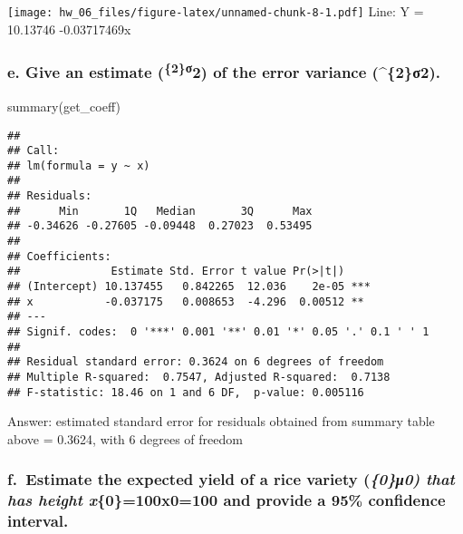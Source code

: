 \documentclass[
]{article}
\newenvironment{Shaded}{\begin{snugshade}}{\end{snugshade}}
\newcommand{\FunctionTok}[1]{\textcolor[rgb]{0.00,0.00,0.00}{#1}}
\newcommand{\NormalTok}[1]{#1}
\begin{document}
\texttt{[image: hw\_06\_files/figure-latex/unnamed-chunk-8-1.pdf]} Line: Y
= 10.13746 -0.03717469x

\hypertarget{e.-give-an-estimate-2ux3c32-of-the-error-variance-2ux3c32.}{%
\subsubsection{\texorpdfstring{e. Give an estimate
(\hat{\sigma}\textsuperscript{\{2\}σ}2) of the error variance
(\sigma\^{}\{2\}σ2).}{e. Give an estimate (\{2\}σ2) of the error variance (\^{}\{2\}σ2).}}\label{e.-give-an-estimate-2ux3c32-of-the-error-variance-2ux3c32.}}

\begin{Shaded}
\begin{Highlighting}[]
\FunctionTok{summary}\NormalTok{(get\_coeff)}
\end{Highlighting}
\end{Shaded}

\begin{verbatim}
## 
## Call:
## lm(formula = y ~ x)
## 
## Residuals:
##      Min       1Q   Median       3Q      Max 
## -0.34626 -0.27605 -0.09448  0.27023  0.53495 
## 
## Coefficients:
##              Estimate Std. Error t value Pr(>|t|)    
## (Intercept) 10.137455   0.842265  12.036    2e-05 ***
## x           -0.037175   0.008653  -4.296  0.00512 ** 
## ---
## Signif. codes:  0 '***' 0.001 '**' 0.01 '*' 0.05 '.' 0.1 ' ' 1
## 
## Residual standard error: 0.3624 on 6 degrees of freedom
## Multiple R-squared:  0.7547, Adjusted R-squared:  0.7138 
## F-statistic: 18.46 on 1 and 6 DF,  p-value: 0.005116
\end{verbatim}

Answer: estimated standard error for residuals obtained from summary
table above = 0.3624, with 6 degrees of freedom

\hypertarget{f.-estimate-the-expected-yield-of-a-rice-variety-0ux3bc0-that-has-height-x0100x0100-and-provide-a-95-confidence-interval.}{%
\subsubsection{\texorpdfstring{f.~Estimate the expected yield of a rice
variety (\mu\emph{\{0\}μ0) that has height x}\{0\}=100x0=100 and provide
a 95\% confidence
interval.}{f.~Estimate the expected yield of a rice variety (\{0\}μ0) that has height x\{0\}=100x0=100 and provide a 95\% confidence interval.}}\label{f.-estimate-the-expected-yield-of-a-rice-variety-0ux3bc0-that-has-height-x0100x0100-and-provide-a-95-confidence-interval.}}
\end{document}
